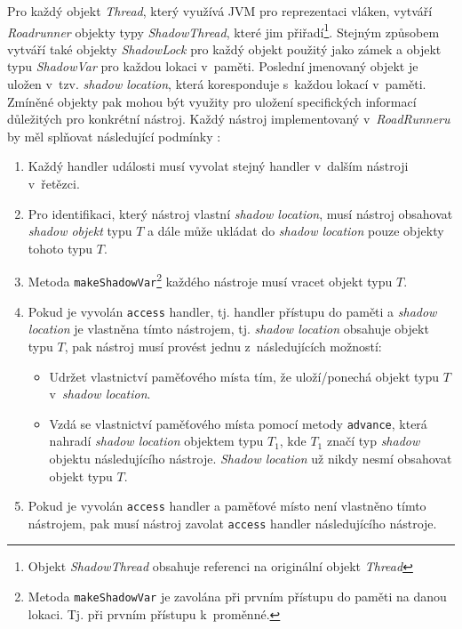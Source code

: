 
Pro každý objekt \textit{Thread}, který využívá JVM pro reprezentaci vláken, vytváří \textit{Roadrunner} objekty typy \textit{ShadowThread}, které jim přiřadí\footnote{Objekt \textit{ShadowThread} obsahuje referenci na originální objekt \textit{Thread}}. Stejným způsobem vytváří také objekty \textit{ShadowLock} pro každý objekt použitý jako zámek a objekt typu \textit{ShadowVar} pro každou lokaci v~paměti. Poslední jmenovaný objekt je uložen v~tzv. \textit{shadow location}, která koresponduje s~každou lokací v~paměti. Zmíněné objekty pak mohou být využity pro uložení specifických informací důležitých pro konkrétní nástroj.
Každý nástroj implementovaný v~\textit{RoadRunneru} by měl splňovat následující podmínky \cite{cite:rr}:
\begin{enumerate}
\item Každý handler události musí vyvolat stejný handler v~dalším nástroji v~řetězci.
\item Pro identifikaci, který nástroj vlastní \textit{shadow location}, musí nástroj obsahovat \textit{shadow objekt} typu $T$ a dále může ukládat do \textit{shadow location} pouze objekty tohoto typu $T$.
\item Metoda \texttt{makeShadowVar}\footnote{Metoda \texttt{makeShadowVar} je zavolána při prvním přístupu do paměti na danou lokaci. Tj. při prvním přístupu k~proměnné.} každého nástroje musí vracet objekt typu $T$.
\item{Pokud je vyvolán \texttt{access} handler, tj. handler přístupu do paměti a \textit{shadow location} je vlastněna tímto nástrojem, tj. \textit{shadow location} obsahuje objekt typu $T$, pak nástroj musí provést jednu z~následujících možností:
	\begin{itemize}
	\item Udržet vlastnictví paměťového místa tím, že uloží/ponechá objekt typu $T$ v~\textit{shadow location}.
	\item{Vzdá se vlastnictví paměťového místa pomocí metody \texttt{advance}, která nahradí \textit{shadow location} objektem typu $T_1$, kde $T_1$ značí typ \textit{shadow} objektu následujícího nástroje. \textit{Shadow location} už nikdy nesmí obsahovat objekt typu $T$.}
	\end{itemize}
}
\item Pokud je vyvolán \texttt{access} handler a paměťové místo není vlastněno tímto nástrojem, pak musí nástroj zavolat \texttt{access} handler následujícího nástroje.
\end{enumerate}

